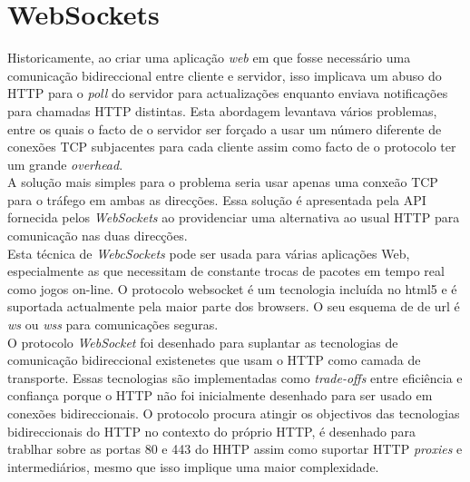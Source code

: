 \section{WebSockets}
Historicamente, ao criar uma aplicação \textit{web} em que fosse necessário uma comunicação bidireccional entre cliente e servidor, isso implicava um abuso do HTTP para o \textit{poll} do servidor para actualizações enquanto enviava notificações para chamadas HTTP distintas. Esta abordagem levantava vários problemas, entre os quais o facto de o servidor ser forçado a usar um número diferente de conexões TCP subjacentes para cada cliente assim como facto de o protocolo ter um grande \textit{overhead}.\\
A solução mais simples para o problema seria usar apenas uma conxeão TCP para o tráfego em ambas as direcções. Essa solução é apresentada pela API fornecida pelos \textit{WebSockets} ao providenciar uma alternativa ao usual HTTP  para comunicação nas duas direcções.\\
Esta técnica de \textit{WebcSockets} pode ser usada para várias aplicações Web, especialmente as que necessitam de constante trocas de pacotes em tempo real como jogos on-line. O protocolo websocket é um tecnologia incluída no html5 e é suportada actualmente pela maior parte dos browsers. O seu esquema de de url é \textit{ws} ou \textit{wss} para comunicações seguras. \\
O protocolo \textit{WebSocket} foi desenhado para suplantar as tecnologias de comunicação bidireccional existenetes que usam o HTTP como camada  de transporte. Essas tecnologias são implementadas como \textit{trade-offs} entre eficiência e confiança porque o HTTP não foi inicialmente desenhado para ser usado em conexões bidireccionais. O protocolo  procura atingir os objectivos das tecnologias bidireccionais do HTTP no contexto do próprio HTTP, é desenhado para trablhar sobre as portas 80 e 443 do HHTP assim como suportar HTTP \textit{proxies} e intermediários, mesmo que isso implique uma maior complexidade.\\


